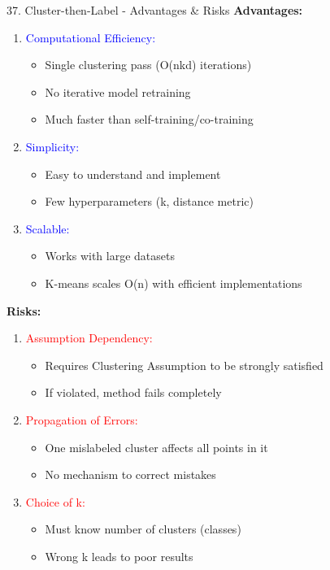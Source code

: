 \documentclass[8pt]{beamer}
\begin{document}
	\begin{frame}{37. Cluster-then-Label - Advantages \& Risks}
		\fontsize{6.5}{7.5}\selectfont
		\textbf{Advantages:}
		
		\begin{enumerate}
			\item \textcolor{blue}{Computational Efficiency:}
			\begin{itemize}
				\item Single clustering pass (O(nkd) iterations)
				\item No iterative model retraining
				\item Much faster than self-training/co-training
			\end{itemize}
			
			\item \textcolor{blue}{Simplicity:}
			\begin{itemize}
				\item Easy to understand and implement
				\item Few hyperparameters (k, distance metric)
			\end{itemize}
			
			\item \textcolor{blue}{Scalable:}
			\begin{itemize}
				\item Works with large datasets
				\item K-means scales O(n) with efficient implementations
			\end{itemize}
		\end{enumerate}
		
		\textbf{Risks:}
		
		\begin{enumerate}
			\item \textcolor{red}{Assumption Dependency:}
			\begin{itemize}
				\item Requires Clustering Assumption to be strongly satisfied
				\item If violated, method fails completely
			\end{itemize}
			
			\item \textcolor{red}{Propagation of Errors:}
			\begin{itemize}
				\item One mislabeled cluster affects all points in it
				\item No mechanism to correct mistakes
			\end{itemize}
			
			\item \textcolor{red}{Choice of k:}
			\begin{itemize}
				\item Must know number of clusters (classes)
				\item Wrong k leads to poor results
			\end{itemize}
		\end{enumerate}
	\end{frame}
	
\end{document}
